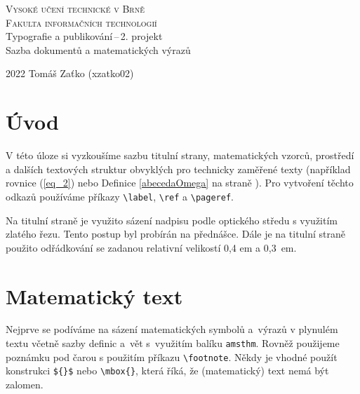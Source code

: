 \documentclass[a4paper, 11pt, twocolumn]{article}
\theoremstyle{plain}
\theoremstyle{plain}
\begin{document}
    \begin{titlepage}
        \begin{center}
            \Huge
            \textsc{Vysoké učení technické v Brně} \\
            \huge
            \textsc{Fakulta informačních technologií} \\[0,4em]
            \LARGE Typografie a publikování\,--\,2. projekt \\
            Sazba dokumentů a matematických výrazů\\[0,3em] 
        \end{center}
        {\Large 2022 \hfill Tomáš Zaťko (xzatko02)}
    \end{titlepage}
    
    \section*{Úvod}
    
    V této úloze si vyzkoušíme sazbu titulní strany, {ma\-te\-matic\-kých} vzorců, prostředí a dalších textových struktur obvyklých pro technicky zaměřené texty (například rovnice (\ref{eq_2}) nebo Definice \ref{abecedaOmega} na straně \pageref{abecedaOmega}). Pro vytvoření těchto odkazů používáme příkazy \verb|\label|, \verb|\ref| a \verb|\pageref|.
    
    Na titulní straně je využito sázení nadpisu podle {op\-tic\-ké\-ho} středu s využitím zlatého řezu. Tento postup byl probírán na přednášce. Dále je na titulní straně použito odřádkování se zadanou relativní velikostí 0,4 em a 0,3~em.
    
    \section{Matematický text}

    Nejprve se podíváme na sázení matematických symbolů a~výrazů v plynulém textu včetně sazby definic a~vět s~využitím balíku \texttt{amsthm}. Rovněž použijeme poznámku pod čarou s použitím příkazu \verb|\footnote|. Někdy je vhodné použít konstrukci \verb|${}$| nebo \verb|\mbox{}|, která říká, že (matematický) text nemá být zalomen. 
    
\end{document}
